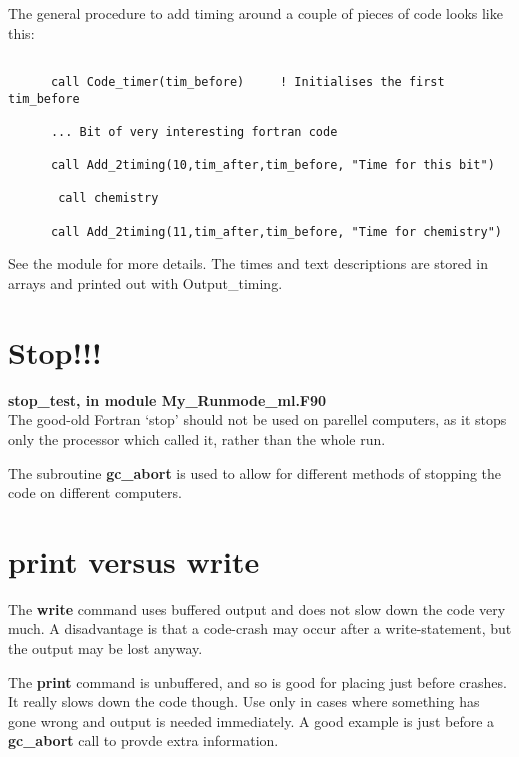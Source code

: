 The general procedure to add timing  around a couple of pieces of code looks like
this:

  \begin{verbatim}

      call Code_timer(tim_before)     ! Initialises the first tim_before

      ... Bit of very interesting fortran code

      call Add_2timing(10,tim_after,tim_before, "Time for this bit")

       call chemistry

      call Add_2timing(11,tim_after,tim_before, "Time for chemistry")

  \end{verbatim}


See the module for more details. The times and text descriptions are stored
in arrays and printed out with Output\_timing. 



\section{Stop!!!}

{\bf stop\_test, in module My\_Runmode\_ml.F90}\\

The good-old Fortran `stop' should not be used on
parellel computers, as it stops only the processor which called  it,
rather than the whole run. 


The subroutine {\bf gc\_abort} is used to allow for
different methods of stopping the code on different
computers.  



\section{print versus write}

The {\bf write} command uses buffered output and does not slow down the code
very much. A disadvantage is that a code-crash  may occur after a write-statement, but
the output may be lost anyway.

The {\bf print} command is unbuffered, and so is good for placing just before crashes.
It really slows down the code though. Use only in cases where something has gone
wrong and output is needed immediately. A good example is just before a
{\bf gc\_abort} call to provde extra information.


\newpage
